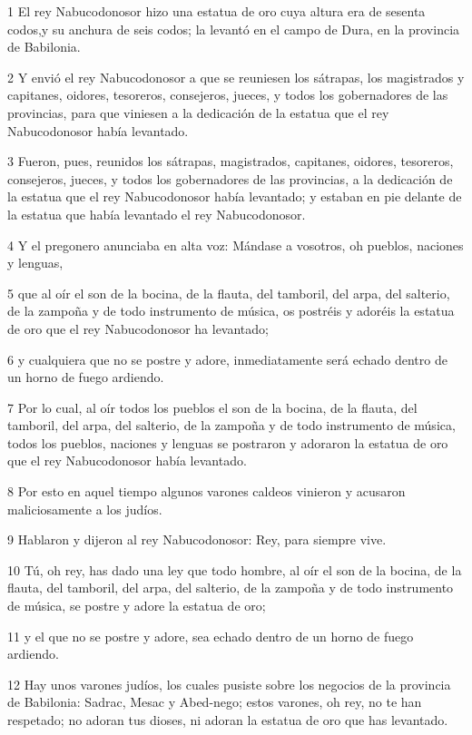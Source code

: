 \par 1 El rey Nabucodonosor hizo una estatua de oro cuya altura era de sesenta codos,y su anchura de seis codos; la levantó en el campo de Dura, en la provincia de Babilonia.
\par 2 Y envió el rey Nabucodonosor a que se reuniesen los sátrapas, los magistrados y capitanes, oidores, tesoreros, consejeros, jueces, y todos los gobernadores de las provincias, para que viniesen a la dedicación de la estatua que el rey Nabucodonosor había levantado.
\par 3 Fueron, pues, reunidos los sátrapas, magistrados, capitanes, oidores, tesoreros, consejeros, jueces, y todos los gobernadores de las provincias, a la dedicación de la estatua que el rey Nabucodonosor había levantado; y estaban en pie delante de la estatua que había levantado el rey Nabucodonosor.
\par 4 Y el pregonero anunciaba en alta voz: Mándase a vosotros, oh pueblos, naciones y lenguas,
\par 5 que al oír el son de la bocina, de la flauta, del tamboril, del arpa, del salterio, de la zampoña y de todo instrumento de música, os postréis y adoréis la estatua de oro que el rey Nabucodonosor ha levantado;
\par 6 y cualquiera que no se postre y adore, inmediatamente será echado dentro de un horno de fuego ardiendo.
\par 7 Por lo cual, al oír todos los pueblos el son de la bocina, de la flauta, del tamboril, del arpa, del salterio, de la zampoña y de todo instrumento de música, todos los pueblos, naciones y lenguas se postraron y adoraron la estatua de oro que el rey Nabucodonosor había levantado.
\par 8 Por esto en aquel tiempo algunos varones caldeos vinieron y acusaron maliciosamente a los judíos.
\par 9 Hablaron y dijeron al rey Nabucodonosor: Rey, para siempre vive.
\par 10 Tú, oh rey, has dado una ley que todo hombre, al oír el son de la bocina, de la flauta, del tamboril, del arpa, del salterio, de la zampoña y de todo instrumento de música, se postre y adore la estatua de oro;
\par 11 y el que no se postre y adore, sea echado dentro de un horno de fuego ardiendo.
\par 12 Hay unos varones judíos, los cuales pusiste sobre los negocios de la provincia de Babilonia: Sadrac, Mesac y Abed-nego; estos varones, oh rey, no te han respetado; no adoran tus dioses, ni adoran la estatua de oro que has levantado.
